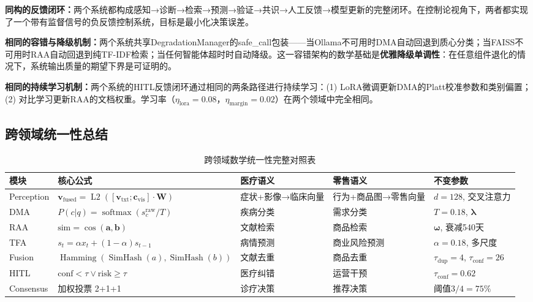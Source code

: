 \documentclass[11pt,a4paper]{ctexart}
\theoremstyle{remark}
\DeclareMathOperator{\softmax}{softmax}
\DeclareMathOperator{\Ltwo}{L2}
\DeclareMathOperator{\Ham}{Hamming}
\DeclareMathOperator{\simhash}{SimHash}
\begin{document}
\textbf{同构的反馈闭环：}两个系统都构成感知→诊断→检索→预测→验证→共识→人工反馈→模型更新的完整闭环。在控制论视角下，两者都实现了一个带有监督信号的负反馈控制系统，目标是最小化决策误差。

\textbf{相同的容错与降级机制：}两个系统共享DegradationManager的safe\_call包装——当Ollama不可用时DMA自动回退到质心分类；当FAISS不可用时RAA自动回退到纯TF-IDF检索；当任何智能体超时时自动降级。这一容错架构的数学基础是\textbf{优雅降级单调性}：在任意组件退化的情况下，系统输出质量的期望下界是可证明的。

\textbf{相同的持续学习机制：}两个系统的HITL反馈闭环通过相同的两条路径进行持续学习：(1) LoRA微调更新DMA的Platt校准参数和类别偏置；(2) 对比学习更新RAA的文档权重。学习率（$\eta_{\text{lora}} = 0.08$，$\eta_{\text{margin}} = 0.02$）在两个领域中完全相同。

\subsection{跨领域统一性总结}

\begin{table}[H]
\centering
\caption{跨领域数学统一性完整对照表}
\small
\begin{tabular}{p{1.8cm}|p{3cm}|p{3cm}|p{3.5cm}|p{2.5cm}}
\toprule
\textbf{模块} & \textbf{核心公式} & \textbf{医疗语义} & \textbf{零售语义} & \textbf{不变参数} \\
\midrule
Perception & $\mathbf{v}_{\text{fused}} = \Ltwo([\mathbf{v}_{\text{txt}}; \mathbf{c}_{\text{vis}}] \cdot \mathbf{W})$ & 症状+影像→临床向量 & 行为+商品图→零售向量 & $d=128$, 交叉注意力 \\
\midrule
DMA & $P(c|q) = \softmax(s_c^{\text{raw}} / T)$ & 疾病分类 & 需求分类 & $T=0.18$, $\boldsymbol{\lambda}$ \\
\midrule
RAA & $\text{sim} = \cos(\mathbf{a}, \mathbf{b})$ & 文献检索 & 商品检索 & $\boldsymbol{\omega}$, 衰减540天 \\
\midrule
TFA & $s_t = \alpha x_t + (1-\alpha)s_{t-1}$ & 病情预测 & 商业风险预测 & $\alpha=0.18$, 多尺度 \\
\midrule
Fusion & $\Ham(\simhash(a), \simhash(b))$ & 文献去重 & 商品去重 & $\tau_{\text{dup}}=4$, $\tau_{\text{conf}}=26$ \\
\midrule
HITL & $\text{conf} < \tau \lor \text{risk} \geq \tau$ & 医疗纠错 & 运营干预 & $\tau_{\text{conf}}=0.62$ \\
\midrule
Consensus & 加权投票 2+1+1 & 诊疗决策 & 推荐决策 & 阈值$3/4=75\%$ \\
\bottomrule
\end{tabular}
\end{table}
\end{document}
